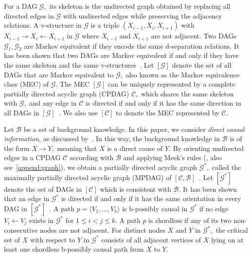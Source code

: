 \documentclass{article}
\begin{document}
For a DAG $\mathcal{G},$ its skeleton is the undirected graph obtained by replacing all directed edges in $\mathcal{G}$ with undirected edges while preserving the adjacency relations.
A v-structure in $\mathcal{G}$ is a triple $(X_{i-1},X_i,X_{i+1})$ with $X_{i-1}\to X_i\leftarrow X_{i+1}$ in $\mathcal{G}$ where $X_{i-1}$ and $X_{i+1}$ are not adjacent.
Two DAGs $\mathcal{G}_1,\mathcal{G}_2$ are Markov equivalent if they encode the same d-separation relations.
It has been shown that two DAGs are Markov equivalent if and only if they have the same skeleton and the same v-structures~\citep{verma1990equivalence}.
Let $\left[\mathcal{G}\right]$ denote the set of all DAGs that are Markov equivalent to $\mathcal{G},$ also known as the Markov equivalence class (MEC) of $\mathcal{G}.$
The MEC $\left[\mathcal{G}\right]$ can be uniquely represented by a complete partially directed acyclic graph (CPDAG) $\mathcal{C},$ which shares the same skeleton with $\mathcal{G},$ and any edge in $\mathcal{C}$ is directed if and only if it has the same direction in all DAGs in $\left[\mathcal{G}\right]$~\citep{verma1990equivalence}.
We also use $\left[\mathcal{C}\right]$ to denote the MEC represented by $\mathcal{C}.$

Let $\mathcal{B}$ be a set of background knowledge.
In this paper, we consider \textit{direct causal information}, as discussed by~\citet{zuo2022counterfactual}.
In this way, the background knowledge in $\mathcal{B}$ is of the form $X\to Y,$ meaning that $X$ is a direct cause of $Y.$
By orienting undirected edges in a CPDAG $\mathcal{C}$ according with $\mathcal{B}$ and applying Meek's rules (\citep{meek1995causal}, also see~\ref{append:graph}), we obtain a partially directed acyclic graph $\mathcal{G}^*,$ called the maximally partially directed acyclic graph (MPDAG) of $[\mathcal{C},\mathcal{B}]$~\citep{fang2022representation}.
Let $\left[\mathcal{G}^*\right]$ denote the set of DAGs in $\left[\mathcal{C}\right]$ which is consistent with $\mathcal{B}.$
It has been shown that an edge in $\mathcal{G}^*$ is directed if and only if it has the same orientation in every DAG in $\left[\mathcal{G}^*\right]$~\citep{meek1995causal}.
A path $p=\langle V_1,\dots,V_k\rangle$ is b-possibly causal in $\mathcal{G}^*$ if no edge $V_i\leftarrow V_j$ exists in $\mathcal{G}^*$ for $1\le i<j\le k.$
A path $p$ is chordless if any of its two non-consecutive nodes are not adjacent.
For distinct nodes $X$ and $Y$ in $\mathcal{G}^*,$ the critical set of $X$ with respect to $Y$ in $\mathcal{G}^*$ consists of all adjacent vertices of $X$ lying on at least one chordless b-possibly causal path from $X$ to $Y.$
\end{document}
